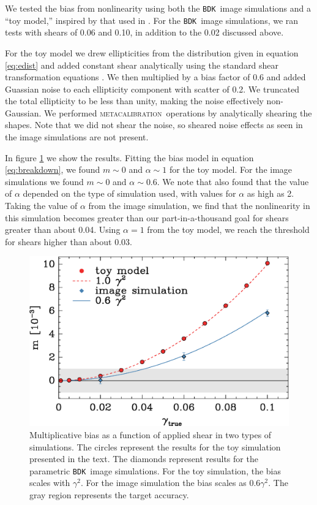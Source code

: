 \documentclass[iop, twocolappendix, appendixfloats, numberedappendix, apj]{emulateapj}
\newcommand{\mcal}{\textsc{metacalibration}}
\newcommand{\bdksim}{\texttt{BDK}}
\begin{document}
We tested the bias from nonlinearity using both the \bdksim\ image
simulations and a ``toy model,'' inspired by that used in \citep{ba14}.
For the \bdksim\ image simulations, we ran tests with shears of
0.06 and 0.10, in addition to the 0.02 discussed above.

For the toy model we drew ellipticities from the distribution given in equation
\ref{eq:edist} and added constant shear analytically using the standard shear
transformation equations \citep{SeitzSchneider97}.  We then multiplied by a
bias factor of 0.6 and added Guassian noise to each ellipticity component with
scatter of 0.2. We truncated the total ellipticity to be less than unity,
making the noise effectively non-Gaussian.  We performed \mcal\ operations by
analytically shearing the shapes.  Note that we did not shear the noise, so
sheared noise effects as seen in the image simulations are not present.

In figure \ref{fig:weaklens} we show the results.  Fitting the bias model in
equation \ref{eq:breakdown}, we found $m \sim 0$ and $\alpha \sim 1$ for the
toy model.  For the image simulations we found $m \sim 0$ and $\alpha \sim
0.6$. We note that \cite{bfd2016} also found that the value of $\alpha$
depended on the type of simulation used, with values for $\alpha$ as high as
2.  Taking the value of $\alpha$ from the image simulation, we find that the
nonlinearity in this simulation becomes greater than our part-in-a-thousand
goal for shears greater than about 0.04.  Using $\alpha=1$ from the toy model,
we reach the threshold for shears higher than about 0.03.

\begin{figure}
	\centering
    \includegraphics[width=\columnwidth]{weaklens-approx.eps}

    \caption{Multiplicative bias as a function of applied shear in two types of
    simulations.  The circles represent the results for the toy simulation
    presented in the text.  The diamonds represent results for the parametric
    \bdksim\ image simulations.  For the toy simulation, the bias scales with
    $\gamma^2$.  For the image simulation the bias scales as $0.6 \gamma^2$.
    The gray region represents the target accuracy.}

\label{fig:weaklens}
\end{figure}
\end{document}

